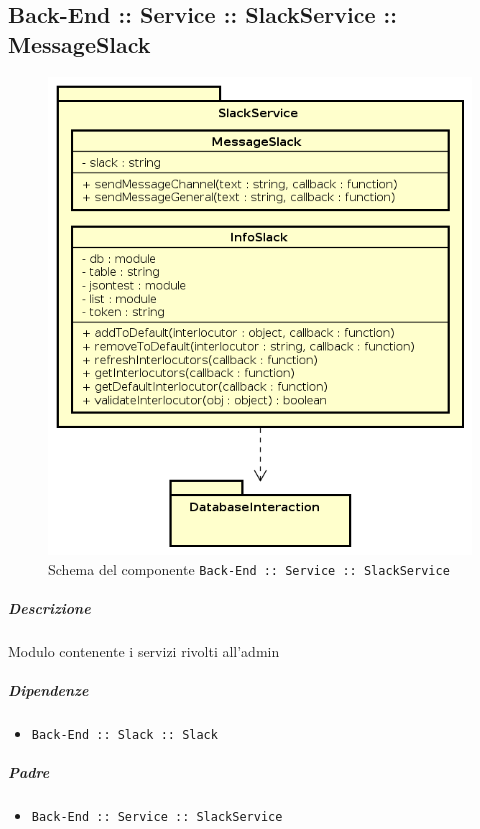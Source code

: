 \documentclass[../ManualeSviluppatore_v1.0.0.tex]{subfiles}
\begin{document}
\subsection{Back-End :: Service :: SlackService :: MessageSlack}
\begin{figure}[!h]
	\centering
	\includegraphics[scale=0.6]{Architettura/Back-End/Service/SlackService.png}
	\caption{Schema del componente \texttt{Back-End :: Service :: SlackService}}
\end{figure}
\subparagraph{Descrizione} Modulo contenente i servizi rivolti all'admin
\subparagraph{Dipendenze}
\begin{itemize}
	\item \texttt{Back-End :: Slack :: Slack}
\end{itemize}
\subparagraph{Padre}
\begin{itemize}
	\item \texttt{Back-End :: Service :: SlackService}
\end{itemize}
\end{document}

